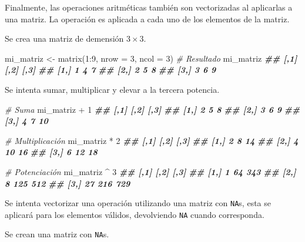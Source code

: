 \documentclass[
]{book}
\newenvironment{Shaded}{\begin{snugshade}}{\end{snugshade}}
\newcommand{\AttributeTok}[1]{\textcolor[rgb]{0.77,0.63,0.00}{#1}}
\newcommand{\CommentTok}[1]{\textcolor[rgb]{0.56,0.35,0.01}{\textit{#1}}}
\newcommand{\DecValTok}[1]{\textcolor[rgb]{0.00,0.00,0.81}{#1}}
\newcommand{\DocumentationTok}[1]{\textcolor[rgb]{0.56,0.35,0.01}{\textbf{\textit{#1}}}}
\newcommand{\FunctionTok}[1]{\textcolor[rgb]{0.00,0.00,0.00}{#1}}
\newcommand{\NormalTok}[1]{#1}
\newcommand{\OtherTok}[1]{\textcolor[rgb]{0.56,0.35,0.01}{#1}}
\newcommand{\SpecialCharTok}[1]{\textcolor[rgb]{0.00,0.00,0.00}{#1}}
\begin{document}
Finalmente, las operaciones aritméticas también son vectorizadas al aplicarlas a una matriz. La operación es aplicada a cada uno de los elementos de la matriz.

Se crea una matriz de demensión \(3\times3\).

\begin{Shaded}
\begin{Highlighting}[]
\NormalTok{mi\_matriz }\OtherTok{\textless{}{-}} \FunctionTok{matrix}\NormalTok{(}\DecValTok{1}\SpecialCharTok{:}\DecValTok{9}\NormalTok{, }\AttributeTok{nrow =} \DecValTok{3}\NormalTok{, }\AttributeTok{ncol =} \DecValTok{3}\NormalTok{)}
\CommentTok{\# Resultado}
\NormalTok{mi\_matriz}
\DocumentationTok{\#\#      [,1] [,2] [,3]}
\DocumentationTok{\#\# [1,]    1    4    7}
\DocumentationTok{\#\# [2,]    2    5    8}
\DocumentationTok{\#\# [3,]    3    6    9}
\end{Highlighting}
\end{Shaded}

Se intenta sumar, multiplicar y elevar a la tercera potencia.

\begin{Shaded}
\begin{Highlighting}[]
\CommentTok{\# Suma}
\NormalTok{mi\_matriz }\SpecialCharTok{+} \DecValTok{1}
\DocumentationTok{\#\#      [,1] [,2] [,3]}
\DocumentationTok{\#\# [1,]    2    5    8}
\DocumentationTok{\#\# [2,]    3    6    9}
\DocumentationTok{\#\# [3,]    4    7   10}

\CommentTok{\# Multiplicación}
\NormalTok{mi\_matriz }\SpecialCharTok{*} \DecValTok{2}
\DocumentationTok{\#\#      [,1] [,2] [,3]}
\DocumentationTok{\#\# [1,]    2    8   14}
\DocumentationTok{\#\# [2,]    4   10   16}
\DocumentationTok{\#\# [3,]    6   12   18}

\CommentTok{\# Potenciación}
\NormalTok{mi\_matriz }\SpecialCharTok{\^{}} \DecValTok{3}
\DocumentationTok{\#\#      [,1] [,2] [,3]}
\DocumentationTok{\#\# [1,]    1   64  343}
\DocumentationTok{\#\# [2,]    8  125  512}
\DocumentationTok{\#\# [3,]   27  216  729}
\end{Highlighting}
\end{Shaded}

Se intenta vectorizar una operación utilizando una matriz con \texttt{NA}s, esta se aplicará para los elementos válidos, devolviendo \texttt{NA} cuando corresponda.

Se crean una matriz con \texttt{NA}s.
\end{document}
